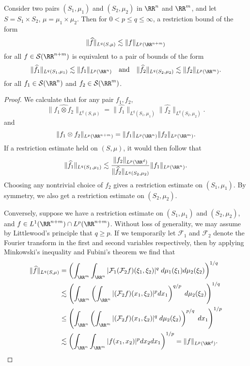 \begin{theorem}
  Consider two pairs $(S_1,\mu_1)$ and $(S_2,\mu_2)$ in $\RR^n$ and $\RR^m$, and let $S = S_1 \times S_2$, $\mu = \mu_1 \times \mu_2$. Then for $0 < p \leq q \leq \infty$, a restriction bound of the form
  \[ \| \widehat{f} \|_{L^q(S,\mu)} \lesssim \| f \|_{L^p(\RR^{n+m})} \]
  for all $f \in \mathcal{S}(\RR^{n+m})$ is equivalent to a pair of bounds of the form
  \[ \| \widehat{f_1} \|_{L^q(S_1,\mu_1)} \lesssim \| f_1 \|_{L^p(\RR^n)} \quad\text{and}\quad \| \widehat{f_2} \|_{L^q(S_2,\mu_2)} \lesssim \| f_2 \|_{L^p(\RR^m)}. \]
  for all $f_1 \in \mathcal{S}(\RR^n)$ and $f_2 \in \mathcal{S}(\RR^m)$.
\end{theorem}
\begin{proof}
  We calculate that for any pair $f_1,f_2$,
  \[ \| \widehat{f_1 \otimes f_2} \|_{L^q(S,\mu)} = \| \widehat{f_1} \|_{L^q(S_1,\mu_1)} \| \widehat{f_2} \|_{L^q(S_2,\mu_2)}. \]
  and
  \[ \| f_1 \otimes f_2 \|_{L^p(\RR^{n+m})} = \| f_1 \|_{L^p(\RR^n)} \| f_2 \|_{L^p(\RR^m)}. \]
  If a restriction estimate held on $(S,\mu)$, it would then follow that
  \[ \| \widehat{f_1} \|_{L^q(S_1,\mu_1)} \lesssim \frac{\| f_2 \|_{L^p(\RR^d)}}{\| \widehat{f_2} \|_{L^q(S_2,\mu_2)}} \| f_1 \|_{L^p(\RR^n)}. \]
  Choosing any nontrivial choice of $f_2$ gives a restriction estimate on $(S_1,\mu_1)$. By symmetry, we also get a restriction estimate on $(S_2,\mu_2)$.

  Conversely, suppose we have a restriction estimate on $(S_1,\mu_1)$ and $(S_2,\mu_2)$, and $f \in L^1(\RR^{n+m}) \cap L^p(\RR^{n+m})$. Without loss of generality, we may assume by Littlewood's principle that $q \geq p$. If we temporarily let $\mathcal{F}_1$ and $\mathcal{F}_2$ denote the Fourier transform in the first and second variables respectively, then by applying Minkowski's inequality and Fubini's theorem we find that
  \begin{align*}
    \| \widehat{f} \|_{L^q(S,\mu)} &= \left( \int_{\RR^m} \int_{\RR^n} |\mathcal{F}_1(\mathcal{F}_2 f)(\xi_1,\xi_2)|^q\; d\mu_1(\xi_1) d\mu_2(\xi_2) \right)^{1/q}\\
    &\lesssim \left( \int_{\RR^m} \left( \int_{\RR^n} |(\mathcal{F}_2 f)(x_1,\xi_2)|^p dx_1 \right)^{q/p}\; d\mu_2(\xi_2) \right)^{1/q}\\
    &\leq \left( \int_{\RR^n} \left( \int_{\RR^m} |(\mathcal{F}_2 f)(x_1,\xi_2)|^q\; d\mu_2(\xi_2) \right)^{p/q}\; dx_1 \right)^{1/p}\\
    &\lesssim \left( \int_{\RR^n} \int_{\RR^m} |f(x_1,x_2)|^p dx_2 dx_1 \right)^{1/p} = \| f \|_{L^p(\RR^d)}. \qedhere
  \end{align*}
\end{proof}

